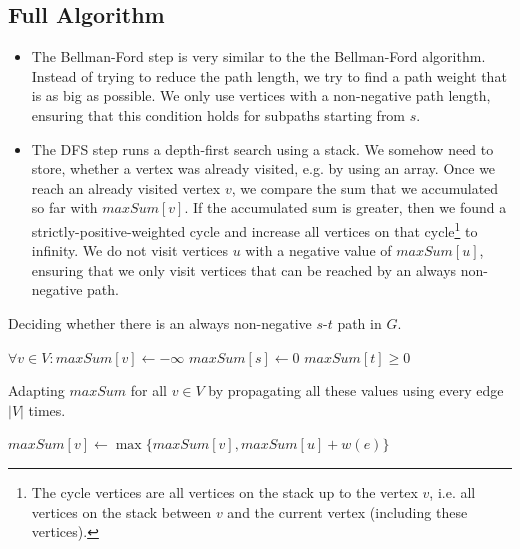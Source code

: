 \documentclass[12pt]{article}
\begin{document}
\subsection*{Full Algorithm}
\begin{itemize}
	\item The Bellman-Ford step is very similar to the the Bellman-Ford algorithm. Instead of trying to reduce the path length, we try to find a path weight that is as big as possible. We only use vertices with a non-negative path length, ensuring that this condition holds for subpaths starting from $s$.
	\item The DFS step runs a depth-first search using a stack. We somehow need to store, whether a vertex was already visited, e.g. by using an array. Once we reach an already visited vertex $v$, we compare the sum that we accumulated so far with $\mathit{maxSum}[v]$. If the accumulated sum is greater, then we found a strictly-positive-weighted cycle and increase all vertices on that cycle\footnote{The cycle vertices are all vertices on the stack up to the vertex $v$, i.e. all vertices on the stack between $v$ and the current vertex (including these vertices).} to infinity. We do not visit vertices $u$ with a negative value of $\mathit{maxSum}[u]$, ensuring that we only visit vertices that can be reached by an always non-negative path.
\end{itemize}

\begin{algorithm}
  \caption{Deciding whether there is an always non-negative $s$-$t$ path in $G$.}
  \begin{algorithmic}[1]

		\State $\forall v \in V: \mathit{maxSum}[v] \gets -\infty$
		\State $\mathit{maxSum}[s] \gets 0$
		\State {}
		\State {}
		\State {}
		\State \Return $\mathit{maxSum}[t] \geq 0$
    \EndFunction
  \end{algorithmic}
\end{algorithm}

\begin{algorithm}
  \caption{Adapting $\mathit{maxSum}$ for all $v \in V$ by propagating all these values using every edge $|V|$ times.}
  \begin{algorithmic}[1]

					\State $\mathit{maxSum}[v] \gets \max \{\mathit{maxSum}[v], \mathit{maxSum}[u] + w(e)\}$
				\EndIf
			\EndFor
		\EndFor
    \EndFunction
  \end{algorithmic}
\end{algorithm}
\end{document}
